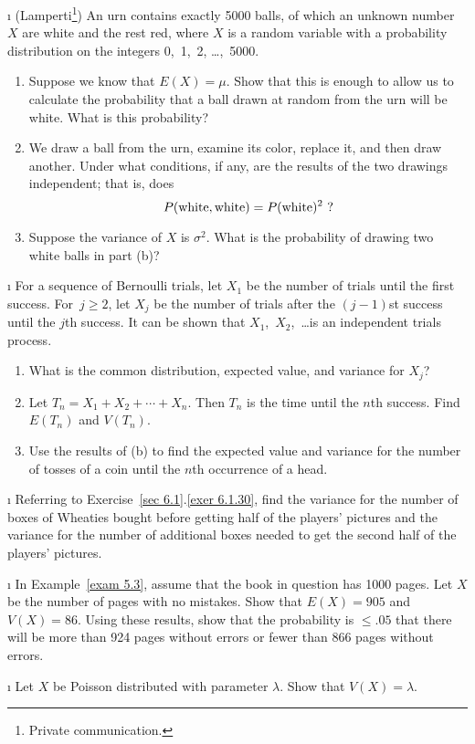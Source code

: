 \begin{LJSItem}
\i\label{exer 6.2.26} (Lamperti\footnote{Private communication.}) An
urn contains exactly 5000 balls, of which an unknown number $X$ are white and the rest red, where $X$
is a random variable with a probability distribution on the integers 0,~1,~2, \dots,~5000.
\begin{enumerate}
\item Suppose we know that $E(X) = \mu$.  Show that this is enough to allow us to
calculate the probability that a ball drawn at random from the urn will be white. 
What is this probability?

\item We draw a ball from the urn, examine its color, replace it, and then draw
another.  Under what conditions, if any, are the results of the two drawings
independent; that is, does
$$
 P({{\rm white},{\rm white}}) =  P({{\rm white}})^2\ ?
$$

\item Suppose the variance of $X$ is $\sigma^2$.  What is the probability of drawing
two white balls in part (b)?

\end{enumerate}


\i\label{exer 6.2.27} For a sequence of Bernoulli trials, let $X_1$ be the number
of trials until the first success.  For~$j \geq 2$, let $X_j$ be the number of trials
after the $(j - 1)$st success until the $j$th success.  It can be shown that 
$X_1$,~$X_2$,~\dots is an independent trials process.
\begin{enumerate}
\item What is the common distribution, expected value, and variance for $X_j$?

\item Let $T_n = X_1 + X_2 +\cdots+ X_n$.  Then $T_n$ is the time until the
$n$th success.  Find $E(T_n)$ and $V(T_n)$.

\item Use the results of (b) to find the expected value and variance for the number
of tosses of a coin until the $n$th occurrence of a head.
\end{enumerate}

\i\label{exer 6.2.28} Referring to Exercise~\ref{sec 6.1}.\ref{exer 6.1.30}, find the
variance for the number of boxes of Wheaties bought before getting half of the players'
pictures and the variance for the number of additional boxes needed to get the second
half of the players' pictures.

\i\label{exer 6.2.99} In Example~\ref{exam 5.3}, assume that the book in question has
1000 pages.  Let
$X$ be the number of pages with no mistakes.  Show that $E(X) = 905$ and $V(X) = 86$. 
Using these results, show that the probability is ${}
\leq .05$ that there will be more than 924 pages without errors or fewer than 866
pages without errors.

\i\label{exer 6.2.100} Let $X$ be Poisson distributed with parameter $\lambda$. 
Show that $V(X) = \lambda$.

\end{LJSItem}

